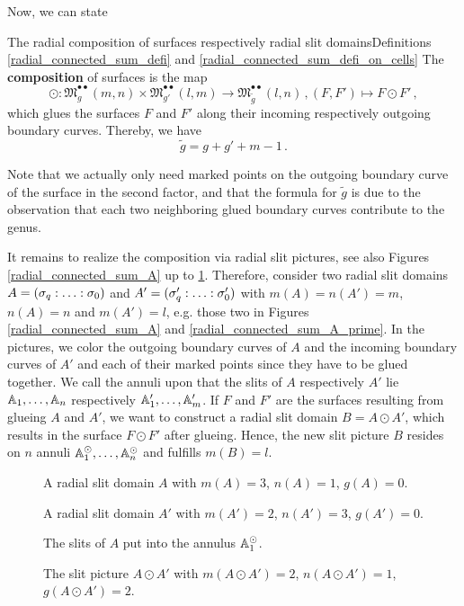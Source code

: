 Now, we can state

\begin{defi}
\label{radial_connected_sum_defi}
\symbolindex[1]{$\odot$} {The radial composition of surfaces respectively radial slit domains}{Definitions \ref{radial_connected_sum_defi} and \ref{radial_connected_sum_defi_on_cells}}
   The \textbf{composition} of surfaces is the map
   \[
      \odot \colon \mathfrak{M}^{\bullet \bullet}_g(m, n) \times \mathfrak{M}^{\bullet \bullet}_{g'}(l, m) \to \mathfrak{M}^{\bullet \bullet}_{\tilde g}(l, n)\,, (F, F') \mapsto F \odot F'\,,
   \]
   which glues the surfaces $F$ and $F'$ along their incoming respectively outgoing boundary curves.
   Thereby, we have
   \[
      \tilde g = g + g' + m - 1\,.
   \]
\end{defi}

Note that we actually only need marked points on the outgoing boundary curve of the surface in the second factor,
and that the formula for $\tilde g$ is due to the observation that each two neighboring glued boundary curves contribute to the genus.

It remains to realize the composition via radial slit pictures, see also Figures \ref{radial_connected_sum_A} up to \ref{radial_connected_sum}. 
Therefore, consider two radial slit domains $A = \homogq$ and $A' = \homogq[\sigma']$ with $m(A) = n(A') = m$, $n(A) = n$ and $m(A') = l$,
e.g. those two in Figures \ref{radial_connected_sum_A} and \ref{radial_connected_sum_A_prime}.
In the pictures, we color the outgoing boundary curves of $A$ and the incoming boundary curves of $A'$ and each of their marked points
since they have to be glued together.
We call the annuli upon that the slits of $A$ respectively $A'$ lie $\mathbb A_1, \dotsc, \mathbb A_n$ respectively $\mathbb A'_1, \dotsc, \mathbb A'_m$. 
If $F$ and $F'$ are the surfaces resulting from glueing $A$ and $A'$, 
we want to construct a radial slit domain $B = A \odot A'$, which results in the surface $F \odot F'$ after glueing.
Hence, the new slit picture $B$ resides on $n$ annuli $\mathbb A^\odot_1, \dotsc, \mathbb A^\odot_n$ and fulfills $m(B) = l$.

\begin{figure}[p]
   \centering
   \caption{\label{radial_connected_sum_A} A radial slit domain $A$ with $m(A) = 3$, $n(A) = 1$, $g(A) = 0$.}
   \vspace{1cm}
   \centering
   \caption{\label{radial_connected_sum_A_prime} A radial slit domain $A'$ with $m(A') = 2$, $n(A') = 3$, $g(A') = 0$.}
   \vspace{1cm}
   \centering
   \caption{\label{radial_connected_sum_A_prime_put_into_A_sharp} The slits of $A$ put into the annulus $\mathbb A_1^\odot$.}
   \caption{\label{radial_connected_sum} The slit picture $A \odot A'$ with $m(A \odot A') = 2$, $n(A \odot A') = 1$, $g(A \odot A') = 2$.}
\end{figure}

